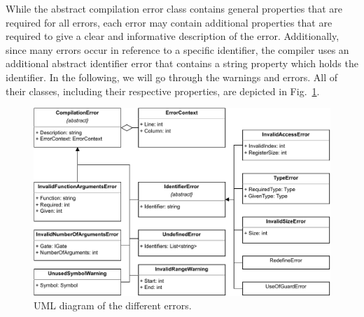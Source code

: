 While the abstract compilation error class contains general properties that are required for all errors, each error may contain additional properties that are required to give a clear and informative description of the error. Additionally, since many errors occur in reference to a specific identifier, the compiler uses an additional abstract identifier error that contains a string property which holds the identifier. In the following, we will go through the warnings and errors. All of their classes, including their respective properties, are depicted in Fig.~\ref{fig:implementation_uml_errors}.


\begin{figure}[htp]
    \centering
    \includegraphics[width=.9\textwidth]{../figures/drawio/uml_errors.pdf}
    \caption{UML diagram of the different errors.}
    \label{fig:implementation_uml_errors}
\end{figure}

